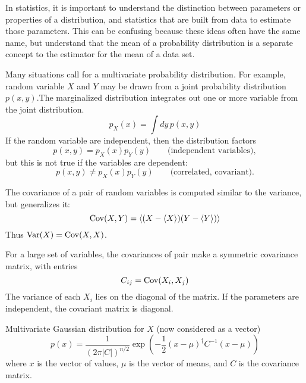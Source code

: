In statistics, it is important to understand the distinction between parameters or properties of a distribution, and statistics that are built from data to estimate those parameters.  This can be confusing because these ideas often have the same name, but understand that the mean of a probability distribution is a separate concept to the estimator for the mean of a data set.

Many situations call for a multivariate probability distribution.  For example, random variable $X$ and $Y$ may be drawn from a joint probability distribution $p(x,y)$.The marginalized distribution integrates out one or more variable from the joint distribution.
\begin{equation}
  p_X(x) = \int dy\, p(x,y)
\end{equation}
If the random variable are independent, then the distribution factors
\begin{equation}
  p(x,y) = p_X(x) p_Y(y)   \qquad\mbox{(independent variables)},
\end{equation}
but this is not true if the variables are dependent:
\begin{equation}
  p(x,y) \neq p_X(x) p_Y(y)   \qquad\mbox{(correlated, covariant)}.
\end{equation}

The covariance of a pair of random variables is computed similar to the variance, but generalizes it:
\begin{equation}
  {\rm Cov}(X,Y) = \left\langle (X - \langle X \rangle)(Y - \langle Y \rangle) \right\rangle
\end{equation}
Thus ${\rm Var}(X) = {\rm Cov}(X,X)$.

For a large set of variables, the covariances of pair make a symmetric covariance matrix, with entries
\begin{equation}
  C_{ij} = {\rm Cov}(X_i, X_j)
\end{equation}
The variance of each $X_i$ lies on the diagonal of the matrix.  If the parameters are independent, the covariant matrix is diagonal.

Multivariate Gaussian distribution for $X$ (now considered as a vector)
\begin{equation}
  p(x) = \frac{1}{(2\pi|C|)^{n/2}} \exp\left(-\frac{1}{2} (x-\mu)^\dag C^{-1} (x-\mu) \right)
\end{equation}
where $x$ is the vector of values, $\mu$ is the vector of means, and $C$ is the covariance matrix.

